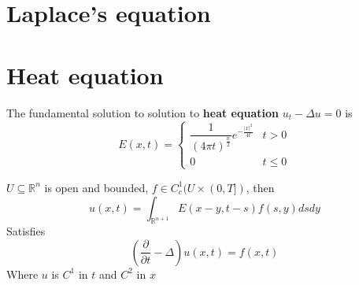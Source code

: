 \documentclass[main]{subfiles}
\begin{document}
\tableofcontents
\newpage

\section{Laplace's equation}



\section{Heat equation}


\begin{definition}
The fundamental solution to solution to \textbf{heat equation} $u_t-\Delta u=0$ is
\[E(x,t)=\begin{cases}
\dfrac{1}{(4\pi t)^{\frac{n}{2}}}e^{-\frac{|x|^2}{4t}} &t>0 \\
0&t\leq0
\end{cases}\]
\end{definition}

\begin{theorem}
$U\subseteq\mathbb R^n$ is open and bounded, $f\in C^1_c(U\times(0,T])$, then
\[u(x,t)=\int_{\mathbb R^{n+1}}E(x-y,t-s)f(s,y)dsdy\]
Satisfies
\[\left(\frac{\partial}{\partial t}-\Delta\right)u(x,t)=f(x,t)\]
Where $u$ is $C^1$ in $t$ and $C^2$ in $x$
\end{theorem}
\end{document}
